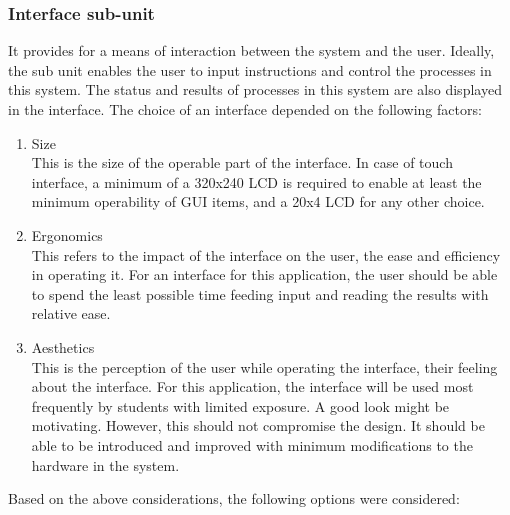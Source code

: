 \subsubsection{Interface sub-unit}
It provides for a means of interaction between the system and the user. Ideally, the sub unit enables the user to input instructions and control the processes in this system. The status and results of processes in this system are also displayed in the interface. The choice of an interface depended on the following factors:
\begin{enumerate}
    \item Size \\
    This is the size of the operable part of the interface. In case of touch interface, a minimum of a 320x240 LCD is required to enable at least the minimum operability of GUI items, and a 20x4 LCD for any other choice.
    \item Ergonomics \\
    This refers to the impact of the interface on the user, the ease and efficiency in operating it. For an interface for this application, the user should be able to spend the least possible time feeding input and reading the results with relative ease. 
    \item Aesthetics \\
    This is the perception of the user while operating the interface, their feeling about the interface. For this application, the interface will be used most frequently by students with limited exposure. A good look might be motivating. However, this should not compromise the design. It should be able to be introduced and improved with minimum modifications to the hardware in the system. 
\end{enumerate}
Based on the above considerations, the following options were considered:
